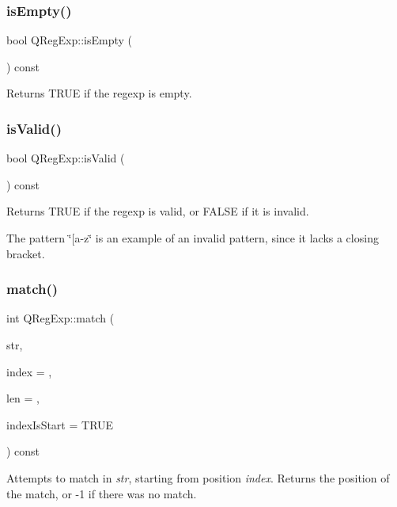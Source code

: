 \subsubsection{\texorpdfstring{isEmpty()}{isEmpty()}}
{\footnotesize\ttfamily bool Q\+Reg\+Exp\+::is\+Empty (\begin{DoxyParamCaption}{ }\end{DoxyParamCaption}) const\hspace{0.3cm}{\ttfamily [inline]}}

Returns T\+R\+UE if the regexp is empty. \mbox{\label{class_q_reg_exp_a2f616e8cd604271fafc5fbe8435e294c}} 
\subsubsection{\texorpdfstring{isValid()}{isValid()}}
{\footnotesize\ttfamily bool Q\+Reg\+Exp\+::is\+Valid (\begin{DoxyParamCaption}{ }\end{DoxyParamCaption}) const\hspace{0.3cm}{\ttfamily [inline]}}

Returns T\+R\+UE if the regexp is valid, or F\+A\+L\+SE if it is invalid.

The pattern \char`\"{}\mbox{[}a-\/z\char`\"{} is an example of an invalid pattern, since it lacks a closing bracket. \mbox{\label{class_q_reg_exp_a7eef4b63ebbda0a41251f2159f288ab9}} 
\subsubsection{\texorpdfstring{match()}{match()}}
{\footnotesize\ttfamily int Q\+Reg\+Exp\+::match (\begin{DoxyParamCaption}\item[{const \mbox{\hyperlink{class_q_c_string}{Q\+C\+String}} \&}]{str,  }\item[{int}]{index = {},  }\item[{int $\ast$}]{len = {},  }\item[{bool}]{index\+Is\+Start = {\ttfamily TRUE} }\end{DoxyParamCaption}) const}

Attempts to match in {\itshape str}, starting from position {\itshape index}. Returns the position of the match, or -\/1 if there was no match.

